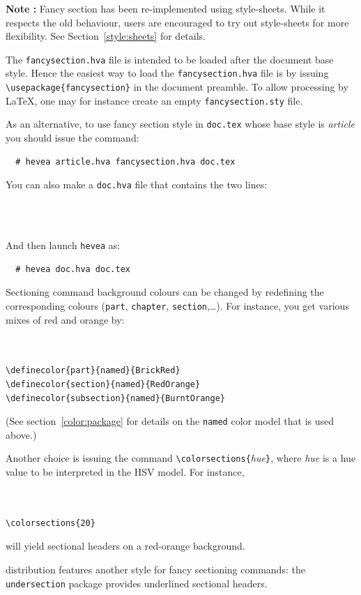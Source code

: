 \textbf{Note : }Fancy section has been re-implemented using style-sheets. While it respects the old behaviour, users are encouraged to try out style-sheets for more flexibility. See Section~\ref{style:sheets} for details.


The \texttt{fancysection.hva} file is intended to be loaded after
the document base style.
Hence the easiest way to load the \texttt{fancysection.hva} file
is by issuing \verb+\usepackage{fancysection}+ in the document preamble.
To allow processing by \LaTeX, one may for instance create
an empty \texttt{fancysection.sty} file.

As an alternative, to use fancy section style in
\texttt{doc.tex} whose base style is \textit{article}
you should issue the command:
\begin{verbatim}
  # hevea article.hva fancysection.hva doc.tex
\end{verbatim}
You can also make a \texttt{doc.hva} file that contains the two lines:
\begin{verbatim}
  
  
\end{verbatim}
And then launch \texttt{hevea} as:
\begin{verbatim}
  # hevea doc.hva doc.tex
\end{verbatim}

Sectioning command background colours can be changed by
redefining the corresponding colours (\texttt{part}, \texttt{chapter},
\texttt{section},\ldots).
For instance, you get various mixes of red and orange by:
\begin{verbatim}


\definecolor{part}{named}{BrickRed}
\definecolor{section}{named}{RedOrange}
\definecolor{subsection}{named}{BurntOrange}
\end{verbatim}
(See section~\ref{color:package} for details on the \texttt{named}
color model that is used above.)

Another choice is issuing the command
\verb+\colorsections{+\textit{hue}\verb+}+, where
\textit{hue} is a hue value to be interpreted in the HSV model.
For instance,
\begin{verbatim}


\colorsections{20}
\end{verbatim}
will yield sectional headers on a red-orange background.

\hevea{} distribution features another style for fancy sectioning commands:
the \texttt{undersection} package provides underlined sectional headers.

